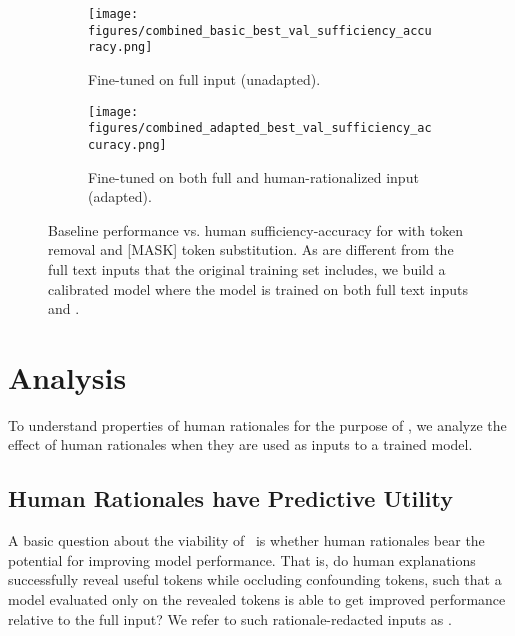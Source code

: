 \begin{figure*}[h]
    \centering
    \begin{subfigure}[t]{0.32\textwidth}
        \centering
        \texttt{[image: figures/combined\_basic\_best\_val\_sufficiency\_accuracy.png]}
        \caption{Fine-tuned on full input (unadapted).}
        \label{fig:combined_unadapted_sufficiency_accuracy}
    \end{subfigure}
    \begin{subfigure}[t]{0.6\textwidth}
        \centering
        \texttt{[image: figures/combined\_adapted\_best\_val\_sufficiency\_accuracy.png]}
        \caption{Fine-tuned on both full and human-rationalized input (adapted).}
        \label{fig:combined_adapted_sufficiency_accuracy}
    \end{subfigure}
   
    \caption{Baseline performance vs. human sufficiency-accuracy for \rationalizedinputs with token removal and [MASK] token substitution.
    As \rationalizedinputs are different from the full text inputs that the original training set includes, we build a calibrated model where the model is trained on both full text inputs and \rationalizedinputs. }
    \label{fig:combined_sufficiency_accuracy}
\end{figure*}




\section{Analysis}
\label{sec:analysis}



To understand properties of human rationales for the purpose of \learningfromexplanation,
we analyze the effect of human rationales when they are used 
as inputs to a trained model. 


\subsection{Human Rationales have Predictive Utility}

A basic question about the viability of \learningfromexplanation~is whether human rationales bear the potential for 
improving model performance. That is, do human explanations successfully reveal useful tokens while occluding confounding tokens, such that a model evaluated only on the revealed tokens is able to get improved performance relative to the full input? We refer to such rationale-redacted inputs as {\em \rationalizedinputs}.



